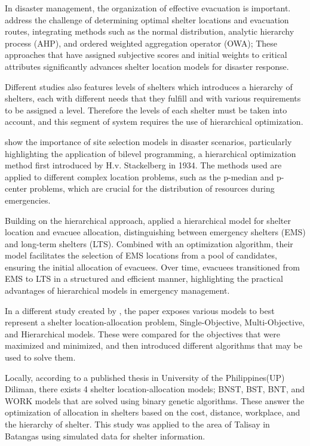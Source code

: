 	In disaster management, the organization of effective evacuation is important. \textcite{Yiying2022} address the challenge of determining optimal shelter locations and evacuation routes, integrating methods such as the normal distribution, analytic hierarchy process (AHP), and ordered weighted aggregation operator (OWA); These approaches that have assigned subjective scores and initial weights to critical attributes significantly advances shelter location models for disaster response.
	
	Different studies also features levels of shelters which introduces a hierarchy of shelters, each with different needs that they fulfill and with various requirements to be assigned a level. Therefore the levels of each shelter must be taken into account, and this segment of system requires the use of hierarchical optimization.
	
	\textcite{Yunjia2019} show the importance of site selection models in disaster scenarios, particularly highlighting the application of bilevel programming, a hierarchical optimization method first introduced by H.v. Stackelberg in 1934. The methods used are applied to different complex location problems, such as the p-median and p-center problems, which are crucial for the distribution of resources during emergencies. 
	
	Building on the hierarchical approach, \textcite{Xiujuan2019} applied a hierarchical model for shelter location and evacuee allocation, distinguishing between emergency shelters (EMS) and long-term shelters (LTS). Combined with an optimization algorithm, their model facilitates the selection of EMS locations from a pool of candidates, ensuring the initial allocation of evacuees. Over time, evacuees transitioned from EMS to LTS in a structured and efficient manner, highlighting the practical advantages of hierarchical models in emergency management. 
	
	In a different study created by \textcite{Yunjia2019}, the paper exposes various models to best represent a shelter location-allocation problem, Single-Objective, Multi-Objective, and Hierarchical models. These were compared for the objectives that were maximized and minimized, and then introduced different algorithms that may be used to solve them.
	
	Locally, according to a published thesis in University of the Philippines(UP) Diliman, there exists 4 shelter location-allocation models; BNST, BST, BNT, and WORK models that are solved using binary genetic algorithms. These answer the optimization of allocation in shelters based on the cost, distance, workplace, and the hierarchy of shelter. This study was applied to the area of Talisay in Batangas using simulated data for shelter information.
	
